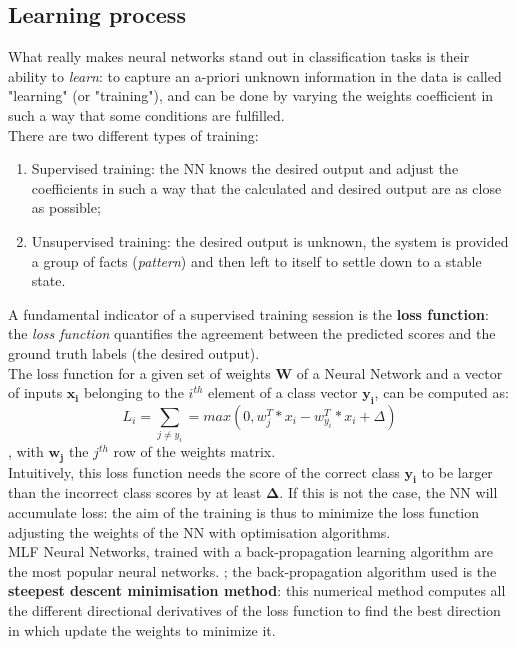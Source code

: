 \documentclass[../main.tex]{subfiles}
\begin{document}
\subsection{Learning process}
What really makes neural networks stand out in classification tasks is their ability to \textit{learn}: to capture an a-priori unknown information in the data is called "learning" (or "training"), and can be done by varying the weights coefficient in such a way that some conditions are fulfilled. \cite{Svozil1997} \\ 
There are two different types of training: 
\begin{enumerate}
	\item Supervised training: the NN knows the desired output and adjust the coefficients in such a way that the calculated and desired output are as close as possible;
	\item Unsupervised training: the desired output is unknown, the system is provided a group of facts (\textit{pattern}) and then left to itself to settle down to a stable state.
\end{enumerate}
\vspace{5mm}
A fundamental indicator of a supervised training session is the \textbf{loss function}: the \textit{loss function} quantifies the agreement between the predicted scores and the ground truth labels (the desired output). \cite{Karpathy2018} \\
The loss function for a given set of weights \textbf{W} of a Neural Network and a vector of inputs $\mathbf{x_i}$ belonging to the $i^{th}$ element of a class vector $\mathbf{y_i}$, can be computed as: \\
$$ L_i = \sum_{j \neq y_i}=max(0,w_j^T*x_i - w_{y_i}^T*x_i+ \Delta )$$,
with $\mathbf{w_j}$ the $j^{th}$ row of the weights matrix. \\
Intuitively, this loss function needs the score of the correct class $\mathbf{y_i}$ to be larger than the incorrect class scores by at least $\mathbf{\Delta}$. If this is not the case, the NN will accumulate loss: the aim of the training is thus to minimize the loss function adjusting the weights of the NN with optimisation algorithms. \\
MLF Neural Networks, trained with a back-propagation learning algorithm are the most popular neural networks. \cite{Svozil1997}; the back-propagation algorithm used is the  \textbf{steepest descent minimisation method}: this numerical method computes all the different directional derivatives of the loss function to find the best direction in which update the weights to minimize it. \\
\end{document}
